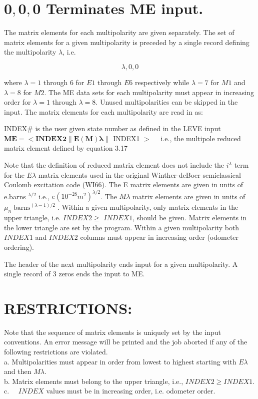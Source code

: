 \documentclass[10pt]{article}
\begin{document}
\section*{$\mathbf{0}, \mathbf{0}, \mathbf{0}$ Terminates ME input.}
The matrix elements for each multipolarity are given separately. The set of matrix elements for a given multipolarity is preceded by a single record defining the multipolarity $\lambda$, i.e.

$$
\lambda, 0,0
$$

where $\lambda=1$ through 6 for $E 1$ through $E 6$ respectively while $\lambda=7$ for $M 1$ and $\lambda=8$ for $M 2$. The ME data sets for each multipolarity must appear in increasing order for $\lambda=1$ through $\lambda=8$. Unused multipolarities can be skipped in the input. The matrix elements for each multipolarity are read in as:

INDEX\# is the user given state number as defined in the LEVE input\\
$\mathbf{M E}=<\mathbf{I N D E X 2}\|\mathbf{E}(\mathbf{M}) \boldsymbol{\lambda}\|$ INDEX1 $>\quad$ i.e., the multipole reduced matrix element defined by equation 3.17

Note that the definition of reduced matrix element does not include the $i^{\lambda}$ term for the $E \lambda$ matrix elements used in the original Winther-deBoer semiclassical Coulomb excitation code (WI66). The E matrix elements are given in units of e.barns ${ }^{\lambda / 2}$ i.e., $e\left(10^{-28} m^{2}\right)^{\lambda / 2}$. The $M \lambda$ matrix elements are given in units of $\mu_{n} \operatorname{barns}^{(\lambda-1) / 2}$. Within a given multipolarity, only matrix elements in the upper triangle, i.e. $I N D E X 2 \geq$ $I N D E X 1$, should be given. Matrix elements in the lower triangle are set by the program. Within a given multipolarity both $I N D E X 1$ and $I N D E X 2$ columns must appear in increasing order (odometer ordering).

The header of the next multipolarity ends input for a given multipolarity. A single record of 3 zeros ends the input to ME.

\section*{RESTRICTIONS:}
Note that the sequence of matrix elements is uniquely set by the input conventions. An error message will be printed and the job aborted if any of the following restrictions are violated.\\
a. Multipolarities must appear in order from lowest to highest starting with $E \lambda$ and then $M \lambda$.\\
b. Matrix elements must belong to the upper triangle, i.e., $I N D E X 2 \geq I N D E X 1$.\\
c. $\quad I N D E X$ values must be in increasing order, i.e. odometer order.
\end{document}
